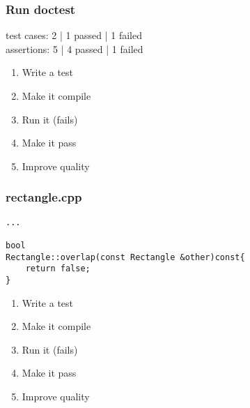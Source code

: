 \begin{frame}[fragile]
\frametitle{Run doctest}
\begin{minipage}[t]{0.48\linewidth}
test cases: 2 | 1 passed | 1 failed\\
assertions: 5 | 4 passed | 1 failed\\
\end{minipage}\hfill
\begin{minipage}[t]{0.28\linewidth}
  \small
  \begin{enumerate} 
    \item \textcolor{deadcolor}{Write a test}
    \item \textcolor{deadcolor}{Make it compile}
    \item \textcolor{activecolor}{Run it (fails)}
    \item \textcolor{deadcolor}{Make it pass}
    \item \textcolor{deadcolor}{Improve quality}
  \end{enumerate} 
\end{minipage}
\end{frame}


\begin{frame}[fragile]
\frametitle{rectangle.cpp}
\begin{minipage}[t]{0.48\linewidth}
\begin{lstlisting}
...

bool 
Rectangle::overlap(const Rectangle &other)const{
    return false;
}
\end{lstlisting}
\end{minipage}\hfill
\begin{minipage}[t]{0.28\linewidth}
  \small
  \begin{enumerate} 
    \item \textcolor{deadcolor}{Write a test}
    \item \textcolor{deadcolor}{Make it compile}
    \item \textcolor{deadcolor}{Run it (fails)}
    \item \textcolor{activecolor}{Make it pass}
    \item \textcolor{deadcolor}{Improve quality}
  \end{enumerate} 
\end{minipage}
\end{frame}


